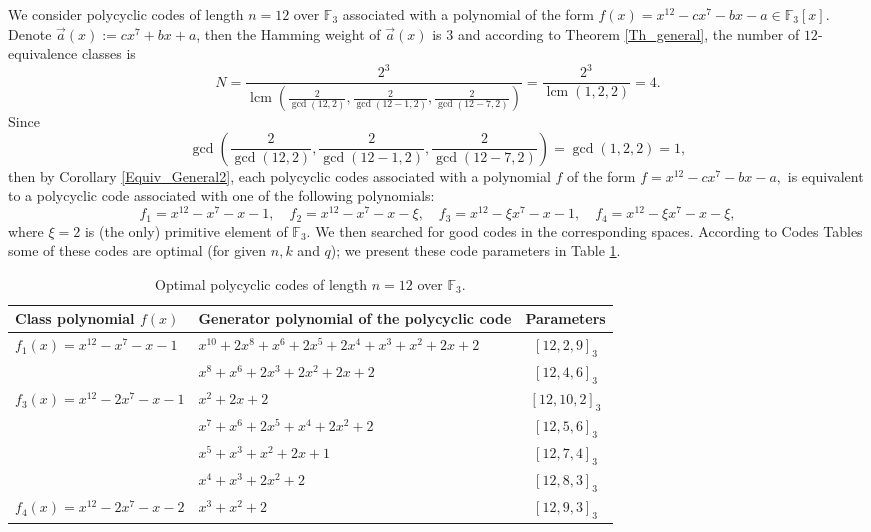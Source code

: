 \documentclass[12pt]{elsarticle}
\DeclareMathOperator{\lcm}{lcm}
\theoremstyle{break}
{\theorembodyfont{\upshape}
    \newtheorem{theorem}{Theorem}[section] %
    \newtheorem{lemma}[theorem]{Lemma} %
    \newtheorem{proposition}[theorem]{Proposition}
    \newtheorem{corollary}[theorem]{Corollary}
    \newtheorem{definition}[theorem]{Definition}
    \newtheorem{example}[theorem]{Example}
    \newtheorem{remark}[theorem]{Remark}
    \newtheorem{conjecture}[theorem]{Conjecture}
    \newtheorem*{proof}{{Proof}}
	\newtheorem*{notation}{Notation}
	\newtheorem*{main}{Cain Theorem}
	\newtheorem*{problem}{Problem}
}
\begin{document}
\begin{example}[Polycyclic codes of length $n=12$ over $\mathbb{F}_3$ ] 
 We consider polycyclic  codes of length $n=12$ over $ \mathbb{F}_{3}$ associated with  a polynomial of the form $f(x)=x^{12}- cx^7-bx-a\in \mathbb{F}_3[x]$.  Denote $\vec{a}(x):=  cx^7+bx+a $, then  the Hamming weight of $ \vec{a}(x) $ is  $3$ and according to Theorem  \ref{Th_general}, the number of $12$-equivalence classes is 
 $$ N= \frac{2^3}{ \lcm( \frac{2}{\gcd( 12,2)}, \frac{2}{\gcd( 12-1,2)}, \frac{2}{\gcd( 12-7,2)} ) }  =
 \frac{2^3}{ \lcm( 1, 2, 2 ) } = 4.$$ 
 Since $$\gcd(  \frac{2}{\gcd( 12,2)}, \frac{2}{\gcd( 12-1,2)}, \frac{2}{\gcd( 12-7,2)}  )= \gcd( 1,2,2 )=1,$$ then by Corollary \ref{Equiv_General2}, 
 each  polycyclic codes associated with a polynomial $f$ of the form $f =x^{12}- cx^7-bx-a,$ is equivalent to a polycyclic  code  associated with one of the following  polynomials: 
 $$f_1= x^{12}-x^7-x-1, \quad f_2= x^{12}- x^{7}-x-\xi, \quad f_3= x^{12}-  \xi x^{7}-x-1, \quad  f_4= x^{12}-  \xi x^{7}-x-\xi,$$
 where $\xi=2$ is (the only) primitive element of $\mathbb{F}_3$. We then searched for good codes in the corresponding spaces. According to Codes Tables \cite{databases} some of these codes are optimal  (for given $n,k$ and $q$); we present these code parameters in  Table \ref{Tab1}.


 \begin{table}[h]
		\small{	\begin{tabular}{|l |l|c|}
						\hline 
		Class polynomial $f(x)$		&	 Generator polynomial of the polycyclic code & Parameters\\
						\hline 
	
  $ f_1(x)=x^{12}-x^7-x-1$&	$ x^{10} + 2x^8 + x^6 + 2x^5 + 2x^4 + x^3 + x^2 +2x + 2 $ &  $ [12, 2, 9]_{3} $\\
							\cline{2-3}
		  	 	&	$ x^8 + x^6 + 2 x^3 + 2x^2 + 2x + 2 $   &  $ [12, 4, 6]_{3}$\\
					\hline 					
											
    $ f_3(x)=x^{12} - 2  x^{7} -x-1 $	 	&	$  x^2 + 2x + 2  $   &  $ [12, 10, 2]_{3}$\\
							\cline{2-3}
						&	$ x^7 + x^6 + 2x^5 + x^4 + 2x^2 + 2 $& $ [12, 5, 6]_{3} $\\
           \cline{2-3}
						&	$ x^5 + x^3 + x^2 + 2 x + 1 $& $ [12, 7, 4]_{3} $\\
     
    \cline{2-3}
						&	$  x^4 + x^3 + 2 x^2 + 2 $& $ [12, 8, 3]_{3} $\\
   \hline 					
											
    $ f_4(x)=x^{12} - 2  x^{7} -x-2  $	 	&	$  x^3 + x^2 + 2 $   &  $ [12, 9, 3]_{3}$\\                     
                    
	\hline 						
\end{tabular} }

\caption{Optimal polycyclic codes of length $n=12$ over   $\mathbb{F}_{3} $.}
\label{Tab1}
\end{table}
\end{example}
\end{document}
